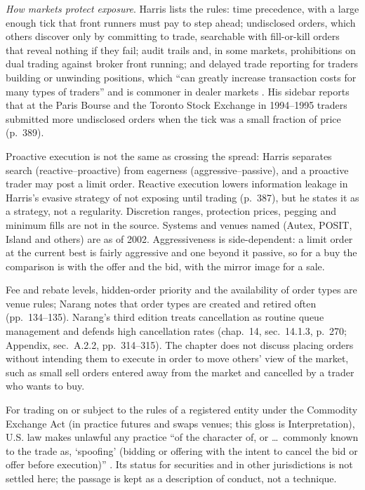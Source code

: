 \begin{qfdefinition}
\emph{How markets protect exposure}. Harris lists the rules: time precedence, with a large enough tick that front runners must pay to step ahead; undisclosed orders, which others discover only by committing to trade, searchable with fill-or-kill orders that reveal nothing if they fail; audit trails and, in some markets, prohibitions on dual trading against broker front running; and delayed trade reporting for traders building or unwinding positions, which ``can greatly increase transaction costs for many types of traders'' and is commoner in dealer markets \citep[chap.~``Buy-Side Traders'', sec.~18.6, p.~389]{alpha-harris}. His sidebar reports that at the Paris Bourse and the Toronto Stock Exchange in 1994--1995 traders submitted more undisclosed orders when the tick was a small fraction of price (p.~389).

 Proactive execution is not the same as crossing the spread: Harris separates search (reactive--proactive) from eagerness (aggressive--passive), and a proactive trader may post a limit order. Reactive execution lowers information leakage in Harris's evasive strategy of not exposing until trading (p.~387), but he states it as a strategy, not a regularity. Discretion ranges, protection prices, pegging and minimum fills are not in the source. Systems and venues named (Autex, POSIT, Island and others) are as of 2002. Aggressiveness is side-dependent: a limit order at the current best is fairly aggressive and one beyond it passive, so for a buy the comparison is with the offer and the bid, with the mirror image for a sale.

Fee and rebate levels, hidden-order priority and the availability of order types are venue rules; Narang notes that order types are created and retired often (pp.~134--135). Narang's third edition treats cancellation as routine queue management and defends high cancellation rates (chap.~14, sec.~14.1.3, p.~270; Appendix, sec.~A.2.2, pp.~314--315). The chapter does not discuss placing orders without intending them to execute in order to move others' view of the market, such as small sell orders entered away from the market and cancelled by a trader who wants to buy.

For trading on or subject to the rules of a registered entity under the Commodity Exchange Act (in practice futures and swaps venues; this gloss is Interpretation), U.S. law makes unlawful any practice ``of the character of, or \dots\ commonly known to the trade as, `spoofing' (bidding or offering with the intent to cancel the bid or offer before execution)'' \citep[paragraph~(a)(5)(C), 2024 edition]{usc-7-6c}. Its status for securities and in other jurisdictions is not settled here; the passage is kept as a description of conduct, not a technique.


\end{qfdefinition}
